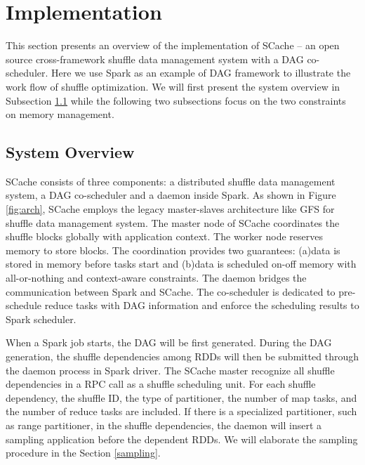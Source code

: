 \section{Implementation}\label{impl}
This section presents an overview of the implementation of SCache -- an open source cross-framework shuffle data management system with a DAG co-scheduler. Here we use Spark as an example of DAG framework to illustrate the work flow of shuffle optimization. We will first present the system overview in Subsection \ref{arch} while the following two subsections focus on the two constraints on memory management.

\subsection{System Overview}\label{arch}
SCache consists of three components: a distributed shuffle data management system, a DAG co-scheduler and a daemon inside Spark. As shown in Figure \ref{fig:arch}, SCache employs the legacy master-slaves architecture like GFS \cite{gfs} for shuffle data management system. 
The master node of SCache coordinates the shuffle blocks globally with application context. The worker node reserves memory to store blocks.
The coordination provides two guarantees: (a)data is stored in memory before tasks start and (b)data is scheduled on-off memory with all-or-nothing and context-aware constraints. 
The daemon bridges the communication between Spark and SCache. The co-scheduler is dedicated to pre-schedule reduce tasks with DAG information and enforce the scheduling results to Spark scheduler.

When a Spark job starts, the DAG will be first generated. 
During the DAG generation, the shuffle dependencies among RDDs will then be submitted through the daemon process in Spark driver. The SCache master recognize all shuffle dependencies in a RPC call as a shuffle scheduling unit.
For each shuffle dependency, the shuffle ID, the type of partitioner, the number of map tasks, and the number of reduce tasks are included.  If there is a specialized partitioner, such as range partitioner, in the shuffle dependencies, the daemon will insert a sampling application before the dependent RDDs. We will elaborate the sampling procedure in the Section \ref{sampling}.


